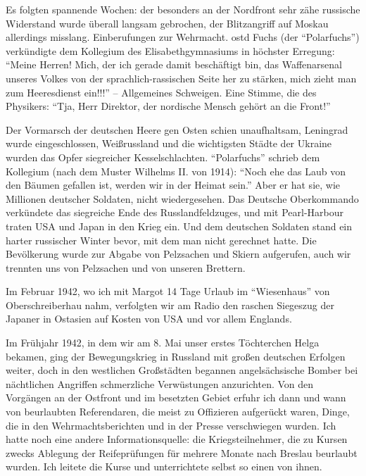 \documentclass[a5paper,pagesize,10pt,twoside=true]{scrbook}
\renewcommand{\marginpar}[2][]{}
\begin{document}
Es folgten spannende Wochen: der besonders an der Nordfront sehr zähe russische Widerstand wurde überall langsam gebrochen, der Blitzangriff auf Moskau allerdings misslang. Einberufungen zur Wehrmacht. \ac{ostd} Fuchs (der \enquote{Polarfuchs}) verkündigte dem Kollegium des Elisabethgymnasiums in höchster Erregung: \enquote{Meine Herren! Mich, der ich gerade damit beschäftigt bin, das Waffenarsenal unseres Volkes von der sprachlich-rassischen Seite her zu stärken, mich zieht man zum Heeresdienst ein!!!} -- Allgemeines Schweigen. Eine Stimme, die des Physikers: \enquote{Tja, Herr Direktor, der nordische Mensch gehört an die Front!}

\marginpar{31} Der Vormarsch der deutschen Heere gen Osten schien unaufhaltsam, Leningrad wurde eingeschlossen, Weißrussland und die wichtigsten Städte der Ukraine wurden das Opfer siegreicher Kesselschlachten. \enquote{Polarfuchs} schrieb dem Kollegium (nach dem Muster Wilhelms II. von 1914): \enquote{Noch ehe das Laub von den Bäumen gefallen ist, werden wir in der Heimat sein.} Aber er hat sie, wie Millionen deutscher Soldaten, nicht wiedergesehen. Das Deutsche Oberkommando verkündete das siegreiche Ende des Russlandfeldzuges, und mit Pearl-Harbour traten USA und Japan in den Krieg ein. Und dem deutschen Soldaten stand ein harter russischer Winter bevor, mit dem man nicht gerechnet hatte. Die Bevölkerung wurde zur Abgabe von Pelzsachen und Skiern aufgerufen, auch wir trennten uns von Pelzsachen und von unseren Brettern.

\marginpar{32} Im Februar 1942, wo ich mit Margot 14 Tage Urlaub im \enquote{Wiesenhaus} von Oberschreiberhau nahm, verfolgten wir am Radio den raschen Siegeszug der Japaner in Ostasien auf Kosten von USA und vor allem Englands.

Im Frühjahr 1942, in dem wir am 8. Mai unser erstes Töchterchen Helga bekamen, ging der Bewegungskrieg in Russland mit großen deutschen Erfolgen weiter, doch in den westlichen Großstädten begannen angelsächsische Bomber bei nächtlichen Angriffen schmerzliche Verwüstungen anzurichten. Von den Vorgängen an der Ostfront und im besetzten Gebiet erfuhr ich dann und wann von beurlaubten Referendaren, die meist zu Offizieren aufgerückt waren, Dinge, die in den Wehrmachtsberichten und in der Presse verschwiegen wurden. Ich hatte noch eine andere Informationsquelle: die Kriegsteilnehmer, die zu Kursen zwecks Ablegung der Reifeprüfungen für \marginpar{33} mehrere Monate nach Breslau beurlaubt wurden. Ich leitete die Kurse und unterrichtete selbst so einen von ihnen.
\end{document}
